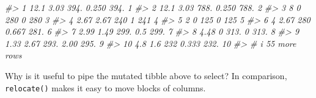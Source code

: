 \documentclass[
]{book}
\newenvironment{Shaded}{\begin{snugshade}}{\end{snugshade}}
\newcommand{\CommentTok}[1]{\textcolor[rgb]{0.56,0.35,0.01}{\textit{#1}}}
\begin{document}
\begin{Shaded}
\begin{Highlighting}[]
\CommentTok{\#\textgreater{}  1   12.1   3.03   394.     0.250     394.       1}
\CommentTok{\#\textgreater{}  2   12.1   3.03   788.     0.250     788.       2}
\CommentTok{\#\textgreater{}  3    8     0      280      0         280        3}
\CommentTok{\#\textgreater{}  4    2.67  2.67   240      1         241        4}
\CommentTok{\#\textgreater{}  5    2     0      125      0         125        5}
\CommentTok{\#\textgreater{}  6    4     2.67   280      0.667     281.       6}
\CommentTok{\#\textgreater{}  7    2.99  1.49   299.     0.5       299.       7}
\CommentTok{\#\textgreater{}  8    4.48  0      313.     0         313.       8}
\CommentTok{\#\textgreater{}  9    1.33  2.67   293.     2.00      295.       9}
\CommentTok{\#\textgreater{} 10    4.8   1.6    232      0.333     232.      10}
\CommentTok{\#\textgreater{} \# i 55 more rows}
\end{Highlighting}
\end{Shaded}

Why is it useful to pipe the mutated tibble above to select? In comparison, \texttt{relocate()} makes it easy to move blocks of columns.
\end{document}
